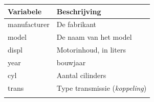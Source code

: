 \documentclass[]{tufte-book}
\begin{document}
\begin{longtable}[]{@{}ll@{}}
\toprule
\begin{minipage}[b]{0.35\columnwidth}\raggedright
Variabele\strut
\end{minipage} & \begin{minipage}[b]{0.59\columnwidth}\raggedright
Beschrijving\strut
\end{minipage}\tabularnewline
\midrule
\endhead
\begin{minipage}[t]{0.35\columnwidth}\raggedright
manufacturer\strut
\end{minipage} & \begin{minipage}[t]{0.59\columnwidth}\raggedright
De fabrikant\strut
\end{minipage}\tabularnewline
\begin{minipage}[t]{0.35\columnwidth}\raggedright
model\strut
\end{minipage} & \begin{minipage}[t]{0.59\columnwidth}\raggedright
De naam van het model\strut
\end{minipage}\tabularnewline
\begin{minipage}[t]{0.35\columnwidth}\raggedright
displ\strut
\end{minipage} & \begin{minipage}[t]{0.59\columnwidth}\raggedright
Motorinhoud, in liters\strut
\end{minipage}\tabularnewline
\begin{minipage}[t]{0.35\columnwidth}\raggedright
year\strut
\end{minipage} & \begin{minipage}[t]{0.59\columnwidth}\raggedright
bouwjaar\strut
\end{minipage}\tabularnewline
\begin{minipage}[t]{0.35\columnwidth}\raggedright
cyl\strut
\end{minipage} & \begin{minipage}[t]{0.59\columnwidth}\raggedright
Aantal cilinders\strut
\end{minipage}\tabularnewline
\begin{minipage}[t]{0.35\columnwidth}\raggedright
trans\strut
\end{minipage} & \begin{minipage}[t]{0.59\columnwidth}\raggedright
Type transmissie (\emph{koppeling})\strut
\end{minipage}\tabularnewline
\begin{minipage}[t]{0.35\columnwidth}\raggedright

\end{minipage}
\end{longtable}
\end{document}
